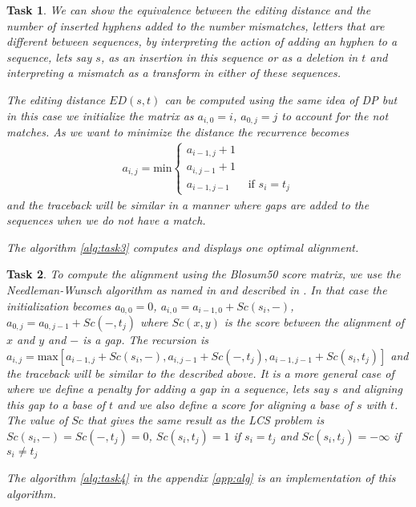 \documentclass[10pt]{article} %
\theoremstyle{problemstyle}
\newtheorem{exercise}{Task}	%
\begin{document}
\begin{exercise} %
We can show the equivalence between the editing distance and the number of inserted hyphens added to the number mismatches, letters that are  different between sequences, by interpreting the action of adding an hyphen to a sequence, lets say $s$, as an insertion in this sequence or as a deletion in $t$ and interpreting a mismatch as a transform in either of these sequences.

The editing distance $ED(s,t)$ can be computed using the same idea of DP but in this case we initialize the matrix as $a_{i,0} = i$, $a_{0,j} = j$ to account for the not matches. As we want to minimize the distance the recurrence becomes
\begin{align*}
a_{i,j}=\text{min}
\begin{cases}
a_{i-1,j}+1 &\\
a_{i,j-1}+1 &\\
a_{i-1,j-1} &\text{ if } s_i=t_j
\end{cases}
\end{align*}
and the traceback will be similar in a manner where gaps are added to the sequences when we do not have a match. 

The algorithm \ref{alg:task3} computes and displays one optimal alignment.
 
\end{exercise}

\begin{exercise} %
	\begin{sloppypar}
To compute the alignment using the Blosum50 score matrix, we use the Needleman-Wunsch algorithm as named in \cite{durbin} and described in \cite{jones}. In that case the initialization becomes $a_{0,0}=0$, $a_{i,0} = a_{i-1,0} + Sc(s_i,-)$, $a_{0,j} = a_{0,j-1} + Sc(-,t_j)$ where $Sc(x,y)$ is the score between the alignment of $x$ and $y$ and $-$ is a gap. The recursion is ${
a_{i,j}=\text{max}[a_{i-1,j}+Sc(s_i,-), a_{i,j-1}+Sc(-,t_j),a_{i-1,j-1}+Sc(s_i,t_j)]}$
and the traceback will be similar to the described above. It is a more general case of  where we define a penalty for adding a gap in a sequence, lets say $s$ and aligning this gap to a base of $t$ and we also define a score for aligning a base of $s$ with $t$. The value of $Sc$ that gives the same result as the LCS problem is $Sc(s_i,-)=Sc(-,t_j)=0$, $Sc(s_i,t_j)=1$ if $s_i=t_j$ and $Sc(s_i,t_j)=-\infty$ if $s_i \neq t_j$
	\end{sloppypar}
The algorithm \ref{alg:task4} in the appendix \ref{app:alg} is an implementation of this algorithm.

\end{exercise}
\end{document}
